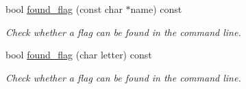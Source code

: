 {\bf }\par
\begin{DoxyCompactItemize}
\item 
bool \hyperlink{class_anyarg_a1305e8be180c7247cb9bdb0994b00597}{found\-\_\-flag} (const char $\ast$name) const 
\begin{DoxyCompactList}\small\item\em Check whether a flag can be found in the command line. \end{DoxyCompactList}\item 
bool \hyperlink{class_anyarg_a8663ada26b0add34878d0929dc436fc5}{found\-\_\-flag} (char letter) const 
\begin{DoxyCompactList}\small\item\em Check whether a flag can be found in the command line. \end{DoxyCompactList}\end{DoxyCompactItemize}

